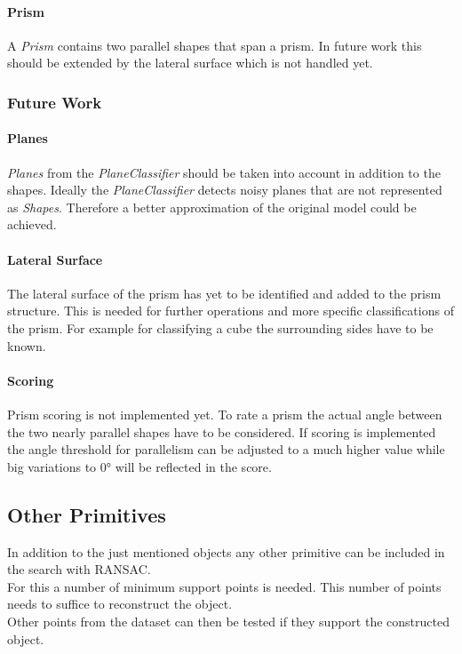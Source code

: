 \documentclass[../ClassicThesis.tex]{subfiles}
\begin{document}
\paragraph{Prism}

A \emph{Prism} contains two parallel shapes that span a prism. In future work this should be extended by the lateral surface which is not handled yet.

\subsubsection{Future Work}
\label{sec:PrismFutureWork}

\paragraph{Planes} \emph{Planes} from the \emph{PlaneClassifier} should be taken into account in addition to the shapes. Ideally the \emph{PlaneClassifier} detects noisy planes that are not represented as \emph{Shapes}. Therefore a better approximation of the original model could be achieved.

\paragraph{Lateral Surface} The lateral surface of the prism has yet to be identified and added to the prism structure. This is needed for further operations and more specific classifications of the prism. For example for classifying a cube the surrounding sides have to be known.

\paragraph{Scoring} Prism scoring is not implemented yet. To rate a prism the actual angle between the two nearly parallel shapes have to be considered. If scoring is implemented the angle threshold for parallelism can be adjusted to a much higher value while big variations to 0° will be reflected in the score.





















\subsection{Other Primitives}
In addition to the just mentioned objects any other primitive can be included in the search with RANSAC. \\
For this a number of minimum support points is needed. This number of points needs to suffice to reconstruct the object. \\
Other points from the dataset can then be tested if they support the constructed object. 
\end{document}

